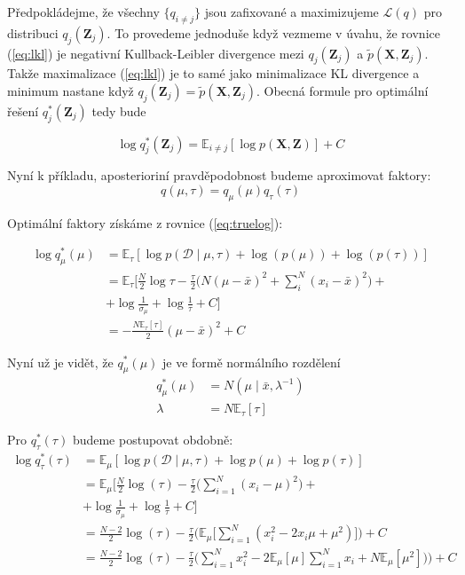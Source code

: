 \documentclass[11pt]{article}
\begin{document}
Předpokládejme, že všechny $\{q_{i \ne j}\}$ jsou zafixované a maximizujeme
$\mathcal{L}(q)$ pro distribuci $q_j(\bm{Z}_j)$.
To provedeme jednoduše když vezmeme v úvahu, že rovnice (\ref{eq:lkl}) je
negativní Kullback-Leibler divergence mezi $q_j(\bm{Z}_j)$ a $\tilde{p}(\bm{X},
\bm{Z}_j)$. Takže maximalizace (\ref{eq:lkl}) je to samé jako minimalizace KL
divergence a minimum nastane když $q_j(\bm{Z}_j) = \tilde{p}(\bm{X},
\bm{Z}_j)$. Obecná formule pro optimální řešení $q_j^*(\bm{Z}_j)$ tedy bude

\begin{equation}
\log q_j^*(\bm{Z}_j) =
    \mathbb{E}_{i \ne j} [ \log p(\bm{X}, \bm{Z})] + C
\label{eq:truelog}
\end{equation}

Nyní k příkladu, aposterioriní pravděpodobnost budeme aproximovat faktory:
\begin{equation}
    q(\mu, \tau) = q_\mu (\mu) q_\tau (\tau)
\end{equation}

Optimální faktory získáme z rovnice (\ref{eq:truelog}):

\begin{align}
\log q_\mu^*(\mu) &=
    \mathbb{E}_\tau [
        \log p(\mathcal{D} \mid \mu, \tau)
        + \log (p(\mu))
        + \log (p(\tau))
    ]
\\
&= \mathbb{E}_\tau \bigg[
    \frac{N}{2} \log \tau
    - \frac{\tau}{2}
    \Big(
        N(\mu - \bar x)^2
        + \sum_i^N (x_i - \bar x)^2
    \Big) +
\\
& + \log \frac{1}{\sigma_\mu}
    + \log \frac{1}{\tau}
    + C
    \bigg]
\nonumber
\\
&= -\frac{N\mathbb{E}_\tau [\tau]}
         {2}
    (\mu - \bar{x})^2 + C
\end{align}

Nyní už je vidět, že $q_\mu^*(\mu)$ je ve formě normálního rozdělení
\begin{align}
q_\mu^*(\mu) &= N(\mu \mid \bar x, \lambda^{-1})
\\
\lambda &= N\mathbb{E}_\tau[\tau]
\end{align}

Pro $q_\tau^*(\tau)$ budeme postupovat obdobně:
\begin{align}
\log q_\tau^*(\tau) &= 
	\mathbb{E}_\mu [
		\log p(\mathcal{D} \mid \mu, \tau) 
		+ \log p(\mu)
		+ \log p(\tau)
	]
\\
&= \mathbb{E}_\mu \bigg[
	\frac{N}{2} \log(\tau)
	- \frac{\tau}{2} \Big(
    \sum_{i=1}^N (x_i - \mu)^2
	\Big) +
\\
& 	+ \log \frac{1}{\sigma_\mu}
	+ \log \frac{1}{\tau}
	+ C
	\bigg]
\nonumber
\\
&= \frac{N-2}{2} \log(\tau)
	- \frac{\tau}{2} \Big(
		\mathbb{E}_\mu \Big[
            \sum_{i=1}^N (x_i^2 - 2 x_i \mu + \mu^2)
        \Big]
	\Big)
	+ C
\\
&= \frac{N-2}{2} \log(\tau)
	- \frac{\tau}{2} \Big(
    \sum_{i=1}^N x_i^2 - 2 \mathbb{E}_\mu[\mu] \sum_{i=1}^N x_i + N
    \mathbb{E}_\mu[\mu^2])
	\Big)
	+ C
\end{align}
\end{document}
